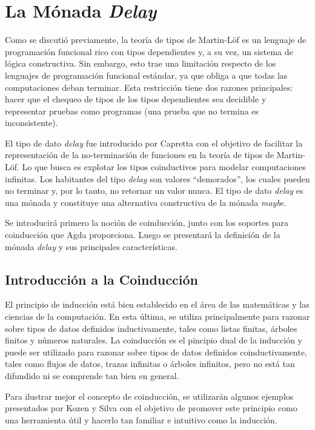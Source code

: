 \chapter{La Mónada \textit{Delay}}\label{chapter:delay}

Como se discutió previamente, la teoría de tipos de Martin-Löf es un lenguaje de programación funcional rico con tipos dependientes y, a su vez, un sistema de lógica constructiva. Sin embargo, esto trae una limitación respecto de los lenguajes de programación funcional estándar, ya que obliga a que todas las computaciones deban terminar. Esta restricción tiene dos razones principales: hacer que el chequeo de tipos de los tipos dependientes sea decidible y representar pruebas como programas (una prueba que no termina es inconsistente). 

El tipo de dato \textit{delay} fue introducido por Capretta \cite{capretta:2005} con el objetivo de facilitar la representación de la no-terminación de funciones en la teoría de tipos de Martin-Löf. Lo que busca es explotar los tipos coinductivos para modelar computaciones infinitas. Los habitantes del tipo \textit{delay} son valores ``demorados'', los cuales pueden no terminar y, por lo tanto, no retornar un valor nunca. El tipo de dato \textit{delay} es una mónada y constituye una alternativa constructiva de la mónada \textit{maybe}. 

Se introducirá primero la noción de coinducción, junto con los soportes para coinducción que Agda proporciona. Luego se presentará la definición de la mónada \textit{delay} y sus principales características.

\section{Introducción a la Coinducción}\label{delay:coind}

El principio de inducción está bien establecido en el área de las matemáticas y las ciencias de la computación. En esta última, se utiliza principalmente para razonar sobre tipos de datos definidos inductivamente, tales como listas finitas, árboles finitos y números naturales. La coinducción es el pincipio dual de la inducción y puede ser utilizado para razonar sobre tipos de datos definidos coinductivamente, tales como flujos de datos, trazas infinitas o árboles infinitos, pero no está tan difundido ni se comprende tan bien en general. 

Para ilustrar mejor el concepto de coinducción, se utilizarán algunos ejemplos presentados por Kozen y Silva \cite{kozen:2017} con el objetivo de promover este principio como una herramienta útil y hacerlo tan familiar e intuitivo como la inducción. 

